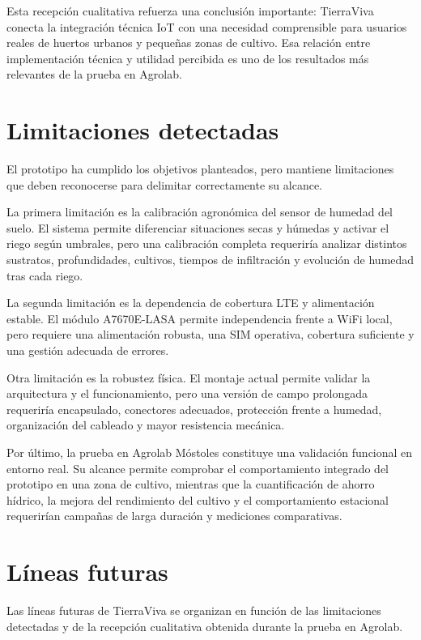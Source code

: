 Esta recepción cualitativa refuerza una conclusión importante: TierraViva conecta la integración técnica IoT con una necesidad comprensible para usuarios reales de huertos urbanos y pequeñas zonas de cultivo. Esa relación entre implementación técnica y utilidad percibida es uno de los resultados más relevantes de la prueba en Agrolab.

\section{Limitaciones detectadas}
\label{sec:limitaciones_detectadas}

El prototipo ha cumplido los objetivos planteados, pero mantiene limitaciones que deben reconocerse para delimitar correctamente su alcance.

La primera limitación es la calibración agronómica del sensor de humedad del suelo. El sistema permite diferenciar situaciones secas y húmedas y activar el riego según umbrales, pero una calibración completa requeriría analizar distintos sustratos, profundidades, cultivos, tiempos de infiltración y evolución de humedad tras cada riego.

La segunda limitación es la dependencia de cobertura LTE y alimentación estable. El módulo A7670E-LASA permite independencia frente a WiFi local, pero requiere una alimentación robusta, una SIM operativa, cobertura suficiente y una gestión adecuada de errores. 

Otra limitación es la robustez física. El montaje actual permite validar la arquitectura y el funcionamiento, pero una versión de campo prolongada requeriría encapsulado, conectores adecuados, protección frente a humedad, organización del cableado y mayor resistencia mecánica.

Por último, la prueba en Agrolab Móstoles constituye una validación funcional en entorno real. Su alcance permite comprobar el comportamiento integrado del prototipo en una zona de cultivo, mientras que la cuantificación de ahorro hídrico, la mejora del rendimiento del cultivo y el comportamiento estacional requerirían campañas de larga duración y mediciones comparativas.

\section{Líneas futuras}
\label{sec:lineas_futuras}

Las líneas futuras de TierraViva se organizan en función de las limitaciones detectadas y de la recepción cualitativa obtenida durante la prueba en Agrolab.

